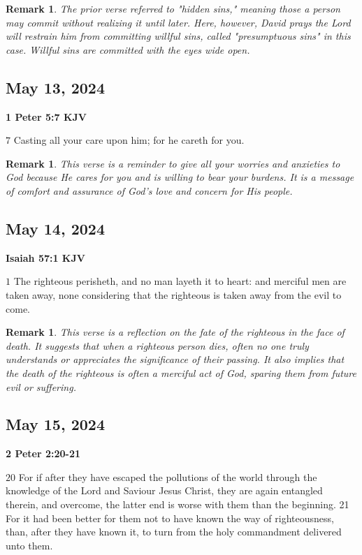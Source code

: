 \documentclass{article}
\newtheorem{remark}[theorem]{Remark}
\begin{document}
\begin{remark}
The prior verse referred to "hidden sins," meaning those a person may commit
without realizing it until later. Here, however, David prays the Lord will
restrain him from committing willful sins, called "presumptuous sins" in
this case. Willful sins are committed with the eyes wide open.
\end{remark}

\bigskip

\subsection{\protect\bigskip May 13, 2024}

\textbf{1 Peter 5:7 KJV}

$7$ Casting all your care upon him; for he careth for you.

\begin{remark}
This verse is a reminder to give all your worries and anxieties to God
because He cares for you and is willing to bear your burdens. It is a
message of comfort and assurance of God's love and concern for His people.
\end{remark}

\subsection{May 14, 2024}

\bigskip \textbf{Isaiah 57:1 KJV}

$1$ The righteous perisheth, and no man layeth it to heart: and merciful men
are taken away, none considering that the righteous is taken away from the
evil to come.

\begin{remark}
This verse is a reflection on the fate of the righteous in the face of
death. It suggests that when a righteous person dies, often no one truly
understands or appreciates the significance of their passing. It also
implies that the death of the righteous is often a merciful act of God,
sparing them from future evil or suffering.
\end{remark}

\bigskip

\subsection{May 15, 2024}

\textbf{2 Peter 2:20-21}

$20$ For if after they have escaped the pollutions of the world through the
knowledge of the Lord and Saviour Jesus Christ, they are again entangled
therein, and overcome, the latter end is worse with them than the beginning.
21 For it had been better for them not to have known the way of
righteousness, than, after they have known it, to turn from the holy
commandment delivered unto them.
\end{document}
